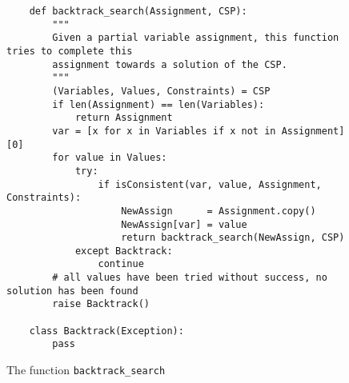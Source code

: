  \begin{figure}[!ht]
\centering
\begin{verbatim}          
    def backtrack_search(Assignment, CSP):
        """
        Given a partial variable assignment, this function tries to complete this 
        assignment towards a solution of the CSP.
        """
        (Variables, Values, Constraints) = CSP
        if len(Assignment) == len(Variables):
            return Assignment
        var = [x for x in Variables if x not in Assignment][0]
        for value in Values:
            try:
                if isConsistent(var, value, Assignment, Constraints):
                    NewAssign      = Assignment.copy()
                    NewAssign[var] = value
                    return backtrack_search(NewAssign, CSP)
            except Backtrack:
                continue
        # all values have been tried without success, no solution has been found
        raise Backtrack()
    
    class Backtrack(Exception):
        pass
\end{verbatim}
\vspace*{-0.3cm}
\caption{The function \texttt{backtrack\_search}}
\label{fig:CSP-Solver.ipynb-backtrack_search}
\end{figure}

